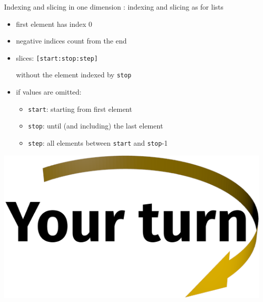 \documentclass[svgnames]{beamer}
\begin{document}
\begin{frame}{Indexing and slicing in one dimension}
 : indexing and slicing as for lists

 \begin{itemize}
  \item first element has index 0
  \item negative indices count from the end
  \item slices: \texttt{[start:stop:step]}\\
        \strut\hphantom{slices:\ }  without the element indexed by \texttt{stop}
  \item if values are omitted:
        \begin{itemize}
         \item \texttt{start}: starting from first element
         \item \texttt{stop}: until (and including) the last element
         \item \texttt{step}: all elements between \texttt{start} and \texttt{stop}-1
        \end{itemize}
 \end{itemize}

 \begin{center}
  \includegraphics[width=3truecm]{yourturn}
 \end{center}
\end{frame}
\end{document}
